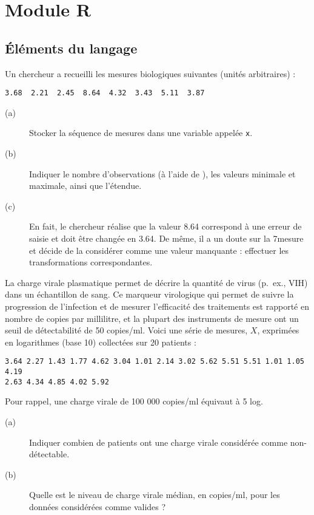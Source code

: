 \part{Module R}

\chapter{Éléments du langage}\label{chap:langage}

\begin{exo}\label{exo:1.1}
Un chercheur a recueilli les mesures biologiques suivantes (unités
arbitraires) :
\begin{verbatim}
3.68  2.21  2.45  8.64  4.32  3.43  5.11  3.87
\end{verbatim}
\begin{description}
\item[(a)] Stocker la séquence de mesures dans une variable appelée
  \texttt{x}.  
\item[(b)] Indiquer le nombre d'observations (à l'aide de \R), les valeurs
  minimale et maximale, ainsi que l'étendue.  
\item[(c)] En fait, le chercheur réalise que la valeur 8.64 correspond à une
  erreur de saisie et doit être changée en 3.64. De même, il a un doute sur
  la 7\ieme mesure et décide de la considérer comme une valeur manquante :
  effectuer les transformations correspondantes. 
\end{description}
\end{exo}

\begin{exo}\label{exo:1.2}
La charge virale plasmatique permet de décrire la quantité de virus (p.~ex.,
VIH) dans un échantillon de sang. Ce marqueur virologique qui permet de
suivre la progression de l’infection et de mesurer l’efficacité des
traitements est rapporté en nombre de copies par millilitre, et la plupart
des instruments de mesure ont un seuil de détectabilité de 50
copies/ml. Voici une série de mesures, $X$, exprimées en logarithmes (base 10)
collectées sur 20 patients :
\begin{verbatim}
3.64 2.27 1.43 1.77 4.62 3.04 1.01 2.14 3.02 5.62 5.51 5.51 1.01 1.05 4.19
2.63 4.34 4.85 4.02 5.92
\end{verbatim}
Pour rappel, une charge virale de 100 000 copies/ml équivaut à 5 log.
\begin{description}
\item[(a)] Indiquer combien de patients ont une charge virale considérée
  comme non-détectable. 
\item[(b)] Quelle est le niveau de charge virale médian, en copies/ml, pour
  les données considérées comme valides ?
\end{description}
\end{exo}

